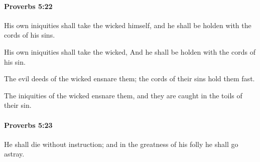 		\paragraph{Proverbs 5:22} %
			\label{PROVERBS-5-22}

			His own iniquities shall take the wicked himself, and he shall be holden with the cords of his sins.

			\begin{versebox}
					\item[BHS] 
					\item[ASV] His own iniquities shall take the wicked, And he shall be holden with the cords of his sin.
					\item[NIV] The evil deeds of the wicked ensnare them; the cords of their sins hold them fast.
					\item[NRSV] The iniquities of the wicked ensnare them, and they are caught in the toils of their sin.
			\end{versebox}

		\paragraph{Proverbs 5:23} %
			\label{PROVERBS-5-23}

			He shall die without instruction; and in the greatness of his folly he shall go astray.

